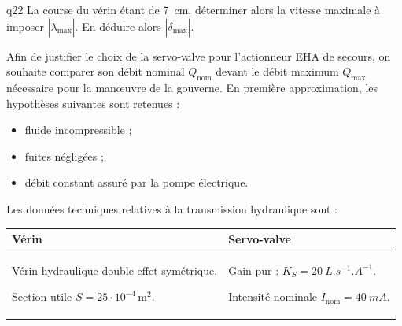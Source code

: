 \begin{multicols}{2}
{\begin{question}{q22}
La course du vérin étant de \SI{7}{cm}, déterminer alors la vitesse maximale à imposer $\left|\dot{\lambda}_{\text{max}}\right|$. En
déduire alors $\left|\dot{\delta}_{\text{max}}\right|$.
\ifprof
\begin{corrige}
\end{corrige}
\else
\fi
\begin{reponses}
\end{reponses} \end{question}}  

Afin de justifier le choix de la servo-valve pour l’actionneur EHA de secours, on souhaite comparer son
débit nominal $Q_{\text{nom}}$ devant le débit maximum $Q_{\text{max}}$ nécessaire pour la man\oe{}uvre de la gouverne.
En première approximation, les hypothèses suivantes sont retenues :
\begin{itemize}
\item fluide incompressible ;
\item fuites négligées ;
\item débit constant assuré par la pompe électrique.
\end{itemize}

Les données techniques relatives à la transmission hydraulique sont :

\begin{center}
\begin{tabular}{|p{.45\linewidth}|p{.45\linewidth}|}
\hline
Vérin & Servo-valve \\
\hline
Vérin hydraulique double effet symétrique.

Section utile $S=25\cdot 10^{-4}\,\text{m}^2$. &

Gain pur : $K_S=\SI{20}{L.s^{-1}.A^{-1}}$.

Intensité nominale $I_{\text{nom}}=\SI{40}{mA}$. \\
\hline
\end{tabular}
\end{center}  





\end{multicols}
